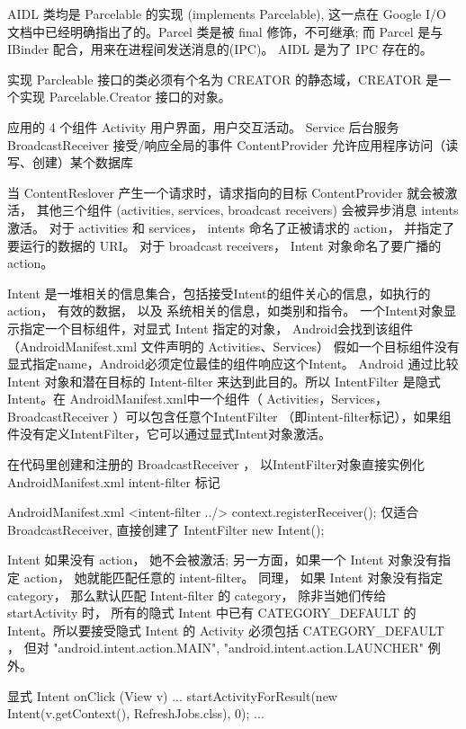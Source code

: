 \documentclass{book}
\begin{document}
\begin{CJK}{UTF8}{gbsn}
{AIDL 类均是 Parcelable 的实现 (implements Parcelable), 这一点在 Google I/O
文档中已经明确指出了的。Parcel 类是被 final 修饰，不可继承; 而 Parcel 是与
IBinder 配合，用来在进程间发送消息的(IPC)。 AIDL 是为了 IPC 存在的。

实现 Parcleable 接口的类必须有个名为 CREATOR 的静态域，CREATOR 是一个实现
Parcelable.Creator 接口的对象。

应用的 4 个组件
Activity  用户界面，用户交互活动。
Service   后台服务
BroadcastReceiver    接受/响应全局的事件
ContentProvider      允许应用程序访问（读写、创建）某个数据库




当 ContentReslover 产生一个请求时，请求指向的目标 ContentProvider 就会被激活，
其他三个组件 (activities, services, broadcast receivers) 会被异步消息 intents
激活。 对于 activities 和 services， intents 命名了正被请求的 action，
并指定了要运行的数据的 URI。 对于 broadcast receivers， Intent
对象命名了要广播的 action。

Intent 是一堆相关的信息集合，包括接受Intent的组件关心的信息，如执行的action，
有效的数据， 以及 系统相关的信息，如类别和指令。
一个Intent对象显示指定一个目标组件，对显式 Intent 指定的对象，
Android会找到该组件（AndroidManifest.xml 文件声明的 Activities、Services）
假如一个目标组件没有显式指定name，Android必须定位最佳的组件响应这个Intent。
Android 通过比较 Intent 对象和潜在目标的 Intent-filter
来达到此目的。所以 IntentFilter 是隐式Intent。在
AndroidManifest.xml中一个组件（ Activities，Services，
BroadcastReceiver ）可以包含任意个IntentFilter
（即intent-filter标记），如果组件没有定义IntentFilter，它可以通过显式Intent对象激活。

在代码里创建和注册的 BroadcastReceiver ， 
以IntentFilter对象直接实例化
AndroidManifest.xml intent-filter 标记

AndroidManifest.xml <intent-filter ../>
context.registerReceiver(); 仅适合 BroadcastReceiver, 直接创建了 IntentFilter
new Intent();


Intent 如果没有 action， 她不会被激活; 另一方面，如果一个 Intent 对象没有指定
action， 她就能匹配任意的 intent-filter。 同理， 如果 Intent 对象没有指定
category， 那么默认匹配 Intent-filter 的 category， 除非当她们传给
startActivity 时， 所有的隐式 Intent 中已有 CATEGORY_DEFAULT 的
Intent。所以要接受隐式 Intent 的 Activity 必须包括 CATEGORY_DEFAULT ， 但对
"android.intent.action.MAIN", "android.intent.action.LAUNCHER" 例外。


显式 Intent
onClick (View v) {
    ...
    startActivityForResult(new Intent(v.getContext(), RefreshJobs.clss),
                        0);
    ...
}


}
\end{CJK}
\end{document}
